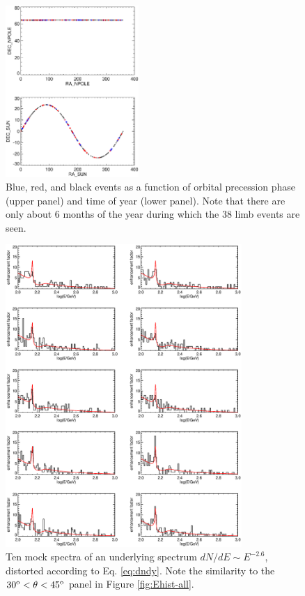 \documentclass[aps,twocolumn,prd,superscriptaddress,showpacs,nofootinbib,fixfloat]{revtex4}
\newcommand{\degree}{^{\rm o}}
\begin{document}
\begin{figure}
\centering
\includegraphics[width=0.45\textwidth]{plots/sun.ps}
\caption{Blue, red, and black events as a function of orbital precession phase
  (upper panel) and time of year (lower panel).  Note that there are only
  about 6 months of the year during which the 38 limb events are seen. 
}
\label{fig:sun}
\end{figure}

\begin{figure}
  \centering
  \includegraphics[width=0.8\textwidth]{plots/limb_bump_model_many.ps}
  \caption{Ten mock spectra of an underlying spectrum $dN/dE \sim E^{-2.6}$,
  distorted according to Eq. \ref{eq:dndy}.  Note the similarity to the
  $30\degree < \theta < 45\degree$ panel in Figure \ref{fig:Ehist-all}.  }
  \label{fig:bumpmodelmany}
\end{figure}
 
\end{document}
